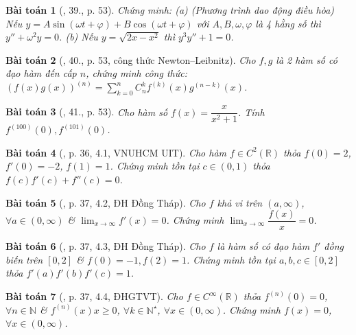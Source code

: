 \documentclass[oneside]{book}
\newtheorem{baitoan}{Bài toán}
\begin{document}
\begin{baitoan}[\cite{TLCT_BT_dai_so_giai_tich_11}, 39., p. 53]
	Chứng minh: (a) {\rm (Phương trình dao động điều hòa)} Nếu $y = A\sin(\omega t + \varphi) + B\cos(\omega t + \varphi)$ với $A,B,\omega,\varphi$ là 4 hằng số thì $y'' + \omega^2y = 0$. (b) Nếu $y = \sqrt{2x - x^2}$ thì $y^3y'' + 1 = 0$.
\end{baitoan}

\begin{baitoan}[\cite{TLCT_BT_dai_so_giai_tich_11}, 40., p. 53, công thức Newton--Leibnitz]
	Cho $f,g$ là 2 hàm số có đạo hàm đến cấp $n$, chứng minh công thức: $(f(x)g(x))^{(n)} = \sum_{k=0}^n C_n^kf^{(k)}(x)g^{(n-k)}(x)$.
\end{baitoan}

\begin{baitoan}[\cite{TLCT_BT_dai_so_giai_tich_11}, 41., p. 53]
	Cho hàm số $f(x) = \dfrac{x}{x^2 + 1}$. Tính $f^{(100)}(0),f^{(101)}(0)$.
\end{baitoan}


\begin{baitoan}[\cite{VMS_VMC2023}, p. 36, 4.1, VNUHCM UIT]
	Cho hàm $f\in C^2(\mathbb{R})$ thỏa $f(0) = 2$, $f'(0) = -2$, $f(1) = 1$. Chứng minh tồn tại $c\in(0,1)$ thỏa $f(c)f'(c) + f''(c) = 0$.
\end{baitoan}

\begin{baitoan}[\cite{VMS_VMC2023}, p. 37, 4.2, ĐH Đồng Tháp]
	Cho $f$ khả vi trên $(a,\infty)$, $\forall a\in(0,\infty)$ \& $\lim_{x\to\infty} f'(x) = 0$. Chứng minh $\lim_{x\to\infty} \dfrac{f(x)}{x} = 0$.
\end{baitoan}

\begin{baitoan}[\cite{VMS_VMC2023}, p. 37, 4.3, ĐH Đồng Tháp]
	Cho $f$ là hàm số có đạo hàm $f'$ đồng biến trên $[0,2]$ \& $f(0) = -1,f(2) = 1$. Chứng minh tồn tại $a,b,c\in[0,2]$ thỏa $f'(a)f'(b)f'(c) = 1$.
\end{baitoan}

\begin{baitoan}[\cite{VMS_VMC2023}, p. 37, 4.4, ĐHGTVT]
	Cho $f\in C^\infty(\mathbb{R})$ thỏa $f^{(n)}(0) = 0$, $\forall n\in\mathbb{N}$ \& $f^{(n)}(x)x\ge0$, $\forall k\in\mathbb{N}^\star$, $\forall x\in(0,\infty)$. Chứng minh $f(x) = 0$, $\forall x\in(0,\infty)$.	 
\end{baitoan}
\end{document}
